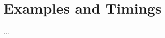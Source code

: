 \documentclass[main.tex]{subfiles}
\begin{document}
  \section{Examples and Timings}\label{sec:examples_timings}

  ...
 
\biblio
\end{document}
